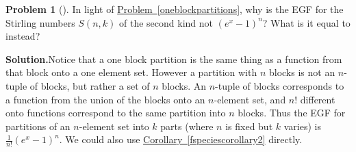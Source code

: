 \documentclass[10pt,]{book}
\theoremstyle{plain}
\theoremstyle{definition}
\newtheorem{activity}[project]{Problem}
\theoremstyle{definition}
\numberwithin{equation}{chapter}
\begin{document}
\begin{activity}[]\label{activity-408}
In light of \hyperref[oneblockpartitions]{Problem~\ref{oneblockpartitions}}, why is the EGF for the Stirling numbers \(S(n,k)\) of the second kind not \((e^x -1)^n\)? What is it equal to instead?%
\par\medskip\noindent%
\textbf{Solution.}\quad Notice that a one block partition is the same thing as a function from that block onto a one element set. However a partition with \(n\) blocks is not an \(n\)-tuple of blocks, but rather a set of \(n\) blocks. An \(n\)-tuple of blocks corresponds to a function from the union of the blocks onto an \(n\)-element set, and \(n!\) different onto functions correspond to the same partition into \(n\) blocks. Thus the EGF for partitions of an \(n\)-element set into \(k\) parts (where \(n\) is fixed but \(k\) varies) is \(\frac{1}{n!} (e^x -1)^n\).  We could also use \hyperref[fspeciescorollary2]{Corollary~\ref{fspeciescorollary2}} directly.%
\end{activity}
\typeout{************************************************}
\typeout{************************************************}
\end{document}
